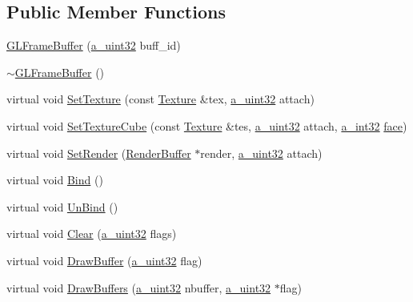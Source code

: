 \subsection*{Public Member Functions}
\begin{DoxyCompactItemize}
\item 
\hyperlink{class_agmd_1_1_g_l_frame_buffer_af0f16a6a9a619b25e7b2de19250d165b}{G\+L\+Frame\+Buffer} (\hyperlink{_common_defines_8h_a964296f9770051b9e4807b1f180dd416}{a\+\_\+uint32} buff\+\_\+id)
\item 
\hyperlink{class_agmd_1_1_g_l_frame_buffer_ac45c928b86662052ec5818bb5a825e4c}{$\sim$\+G\+L\+Frame\+Buffer} ()
\item 
virtual void \hyperlink{class_agmd_1_1_g_l_frame_buffer_af91869c72a294277dd3491e60115753a}{Set\+Texture} (const \hyperlink{class_agmd_1_1_texture}{Texture} \&tex, \hyperlink{_common_defines_8h_a964296f9770051b9e4807b1f180dd416}{a\+\_\+uint32} attach)
\item 
virtual void \hyperlink{class_agmd_1_1_g_l_frame_buffer_a7fb198c28e6e3d18243e4dd5db35de00}{Set\+Texture\+Cube} (const \hyperlink{class_agmd_1_1_texture}{Texture} \&tes, \hyperlink{_common_defines_8h_a964296f9770051b9e4807b1f180dd416}{a\+\_\+uint32} attach, \hyperlink{_common_defines_8h_ae2e4316e0b924774484a728669bebc9b}{a\+\_\+int32} \hyperlink{_planet_8cpp_ae1161f79bdbe47164b23549af2139d25}{face})
\item 
virtual void \hyperlink{class_agmd_1_1_g_l_frame_buffer_aedcf363dad623c9d1fb457f5da6b8d78}{Set\+Render} (\hyperlink{class_agmd_1_1_render_buffer}{Render\+Buffer} $\ast$render, \hyperlink{_common_defines_8h_a964296f9770051b9e4807b1f180dd416}{a\+\_\+uint32} attach)
\item 
virtual void \hyperlink{class_agmd_1_1_g_l_frame_buffer_ae5d7e0a20ab564d8dbaf5a0f3304cd00}{Bind} ()
\item 
virtual void \hyperlink{class_agmd_1_1_g_l_frame_buffer_a5f2c641f2eee6774075b27ebaaca5116}{Un\+Bind} ()
\item 
virtual void \hyperlink{class_agmd_1_1_g_l_frame_buffer_a246cdc0e9c57809198cc47f6f2b98c6a}{Clear} (\hyperlink{_common_defines_8h_a964296f9770051b9e4807b1f180dd416}{a\+\_\+uint32} flags)
\item 
virtual void \hyperlink{class_agmd_1_1_g_l_frame_buffer_a4ab81541e7f5ce00a8133f7205f2a8fa}{Draw\+Buffer} (\hyperlink{_common_defines_8h_a964296f9770051b9e4807b1f180dd416}{a\+\_\+uint32} flag)
\item 
virtual void \hyperlink{class_agmd_1_1_g_l_frame_buffer_adfb6868ae71343a897ce1886a234c4d9}{Draw\+Buffers} (\hyperlink{_common_defines_8h_a964296f9770051b9e4807b1f180dd416}{a\+\_\+uint32} nbuffer, \hyperlink{_common_defines_8h_a964296f9770051b9e4807b1f180dd416}{a\+\_\+uint32} $\ast$flag)

\end{DoxyCompactItemize}
